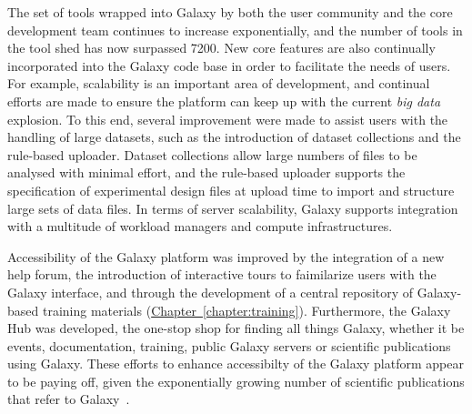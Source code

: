 The set of tools wrapped into Galaxy by both the user community and the core development team continues to increase exponentially, and the number of tools in the tool shed has now surpassed 7200. New core features are also continually incorporated into the Galaxy code base in order to facilitate the needs of users. For example, scalability is an important area of development, and continual efforts are made to ensure the platform can keep up with the current \emph{big data} explosion. To this end, several improvement were made to assist users with the handling of large datasets, such as the introduction of dataset collections and the rule-based uploader. Dataset collections allow large numbers of files to be analysed with minimal effort, and the rule-based uploader supports the specification of experimental design files at upload time to import and structure large sets of data files. In terms of server scalability, Galaxy supports integration with a multitude of workload managers and compute infrastructures.

Accessibility of the Galaxy platform was improved by the integration of a new help forum, the introduction of interactive tours to faimilarize users with the Galaxy interface, and through the development of a central repository of Galaxy-based training materials (\hyperref[chapter:galaxy]{Chapter~\ref{chapter:training}}). Furthermore, the Galaxy Hub was developed, the one-stop shop for finding all things Galaxy, whether it be events, documentation, training, public Galaxy servers or scientific publications using Galaxy. These efforts to enhance accessibilty of the Galaxy platform appear to be paying off, given the exponentially growing number of scientific publications that refer to Galaxy~\cite{url-zotero-galaxy}.


